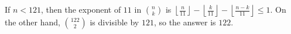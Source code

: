 If $n<121$, then the exponent of $11$ in $\binom{n}{k}$ is $\left\lfloor\frac{n}{11}\right\rfloor-\left\lfloor\frac{k}{11}\right\rfloor-\left\lfloor\frac{n-k}{11}\right\rfloor\leq1$. On the other hand, $\binom{122}{2}$ is divisible by $121$, so the answer is $\boxed{122}$.